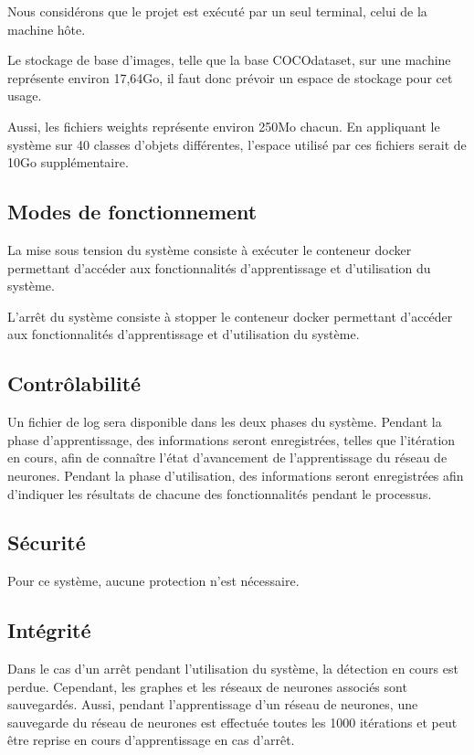 \documentclass[debug,nodate,hideweeklyreports]{polytech/polytech}
\begin{document}
Nous considérons que le projet est exécuté par un seul terminal, celui de la machine hôte.

Le stockage de base d’images, telle que la base COCOdataset, sur une machine représente environ 17,64Go, il faut donc prévoir un espace de stockage pour cet usage.

Aussi, les fichiers weights représente environ 250Mo chacun. En appliquant le système sur 40 classes d'objets différentes, l'espace utilisé par ces fichiers serait de 10Go supplémentaire.

\subsection{Modes de fonctionnement}

La mise sous tension du système consiste à exécuter le conteneur docker permettant d'accéder aux fonctionnalités d’apprentissage et d’utilisation du système.

L’arrêt du système consiste à stopper le conteneur docker permettant d'accéder aux fonctionnalités d’apprentissage et d’utilisation du système.

\subsection{Contrôlabilité}

Un fichier de log sera disponible dans les deux phases du système.
Pendant la phase d’apprentissage, des informations seront enregistrées, telles que l’itération en cours, afin de connaître l’état d’avancement de l’apprentissage du réseau de neurones.
Pendant la phase d’utilisation, des informations seront enregistrées afin d’indiquer les résultats de chacune des fonctionnalités pendant le processus.

\subsection{Sécurité}

Pour ce système, aucune protection n’est nécessaire. 

\subsection{Intégrité}

Dans le cas d’un arrêt pendant l’utilisation du système, la détection en cours est perdue. Cependant, les graphes et les réseaux de neurones associés sont sauvegardés.
Aussi, pendant l’apprentissage d’un réseau de neurones, une sauvegarde du réseau de neurones est effectuée toutes les 1000 itérations et peut être reprise en cours d’apprentissage en cas d’arrêt.
\end{document}
